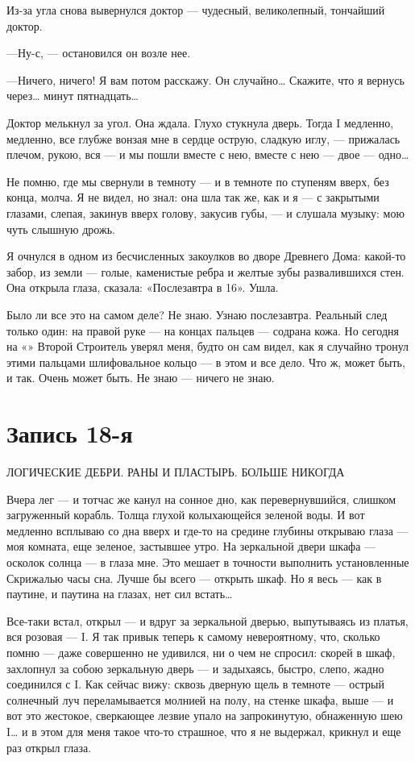 \documentclass[11pt,openany]{book}
\newcommand{\bookchapterplain}[1]{%
  \clearpage\phantomsection\chapter*{#1}%
  \addcontentsline{toc}{chapter}{#1}\markboth{#1}{#1}\thispagestyle{plain}}
\begin{document}
Из-за угла снова вывернулся доктор --- чудесный, великолепный, тончайший доктор.

---Ну-с, --- остановился он возле нее.

---Ничего, ничего! Я вам потом расскажу. Он случайно\ldots{} Скажите, что я вернусь через\ldots{} минут пятнадцать\ldots{}

Доктор мелькнул за угол. Она ждала. Глухо стукнула дверь. Тогда I медленно, медленно, все глубже вонзая мне в сердце острую, сладкую иглу, --- прижалась плечом, рукою, вся --- и мы пошли вместе с нею, вместе с нею --- двое --- одно\ldots{}

Не помню, где мы свернули в темноту --- и в темноте по ступеням вверх, без конца, молча. Я не видел, но знал: она шла так же, как и я --- с закрытыми глазами, слепая, закинув вверх голову, закусив губы, --- и слушала музыку: мою чуть слышную дрожь.

Я очнулся в одном из бесчисленных закоулков во дворе Древнего Дома: какой-то забор, из земли --- голые, каменистые ребра и желтые зубы развалившихся стен. Она открыла глаза, сказала: «Послезавтра в 16». Ушла.

Было ли все это на самом деле? Не знаю. Узнаю послезавтра. Реальный след только один: на правой руке --- на концах пальцев --- содрана кожа. Но сегодня на «» Второй Строитель уверял меня, будто он сам видел, как я случайно тронул этими пальцами шлифовальное кольцо --- в этом и все дело. Что ж, может быть, и так. Очень может быть. Не знаю --- ничего не знаю.

\bookchapterplain{Запись 18-я}

\begin{center}\textsc{ЛОГИЧЕСКИЕ ДЕБРИ. РАНЫ И ПЛАСТЫРЬ. БОЛЬШЕ НИКОГДА}\end{center}

Вчера лег --- и тотчас же канул на сонное дно, как перевернувшийся, слишком загруженный корабль. Толща глухой колыхающейся зеленой воды. И вот медленно всплываю со дна вверх и где-то на средине глубины открываю глаза --- моя комната, еще зеленое, застывшее утро. На зеркальной двери шкафа --- осколок солнца --- в глаза мне. Это мешает в точности выполнить установленные Скрижалью часы сна. Лучше бы всего --- открыть шкаф. Но я весь --- как в паутине, и паутина на глазах, нет сил встать\ldots{}

Все-таки встал, открыл --- и вдруг за зеркальной дверью, выпутываясь из платья, вся розовая --- I. Я так привык теперь к самому невероятному, что, сколько помню --- даже совершенно не удивился, ни о чем не спросил: скорей в шкаф, захлопнул за собою зеркальную дверь --- и задыхаясь, быстро, слепо, жадно соединился с I. Как сейчас вижу: сквозь дверную щель в темноте --- острый солнечный луч переламывается молнией на полу, на стенке шкафа, выше --- и вот это жестокое, сверкающее лезвие упало на запрокинутую, обнаженную шею I\ldots{} и в этом для меня такое что-то страшное, что я не выдержал, крикнул и еще раз открыл глаза.
\end{document}
